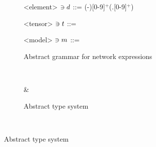 \begin{figure}
	\begin{subfigure}{\textwidth}
	\centering
	\begin{minipage}[t]{0.44\textwidth}
	\begin{grammar}	
	<element> $\ni d$ ::= (-)[0-9]$^+$(.[0-9]$^+$)
	\end{grammar}
	\end{minipage}
	\hfill
	\begin{minipage}[t]{0.23\textwidth}
	\begin{grammar}	
	<tensor> $\ni t$ ::= \missing
	\end{grammar}
	\end{minipage}
	\hfill
	\begin{minipage}[t]{0.24\textwidth}
	\begin{grammar}
	<model> $\ni m$ ::= \missing
	\end{grammar}
	\end{minipage}
	\vspace{0.8em}
	\caption{Abstract grammar for network expressions}
	\label{fig:onnx-expr-syntax}
	\end{subfigure}
	\\
	
	\begin{subfigure}{\textwidth}
	\begin{minipage}[t]{0.5\textwidth}
	\begin{flalign*}
		&\inferrule*[Right=(Element)]{
            \missing
        }{
            \vdash \elementVar : \elementTypeVar
        }
        \hspace{8em}
        \inferrule*[Right=(Tensor)]{
            \missing 
        }{
            \vdash \tensorVar : \tensorTypeVar
        }
        \hspace{8em}
	    \inferrule*[Right=(Model)]{
            \missing
        }{
            \vdash \modelVar : \modelTypeVar 
        }
    \end{flalign*}	
	\end{minipage}
	\caption{Abstract type system}
	\label{fig:onnx-types}
	\end{subfigure}
	\\
	

\end{figure}
